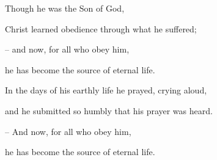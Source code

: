 Though he was the Son of God,\par
Christ learned obedience through what he suffered;\par
– and now, for all who obey him,\par
he has become the source of eternal life.\par
\vspace{5pt}
In the days of his earthly life he prayed, crying aloud,\par
and he submitted so humbly that his prayer was heard.\par
– And now, for all who obey him,\par
he has become the source of eternal life.\par
